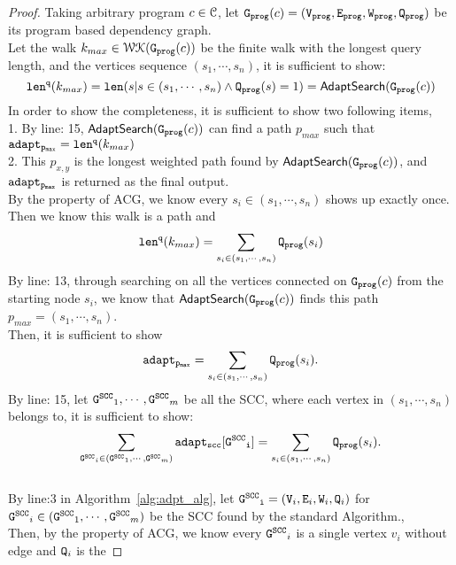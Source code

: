 \begin{proof}
  Taking arbitrary program $c \in \mathcal{C}$, let $\mathtt{{G_{prog}}}(c) = (\mathtt{{V_{prog}}}, \mathtt{{E_{prog}}}, \mathtt{{W_{prog}}}, \mathtt{{Q_{prog}}})$ be its 
  program based dependency graph.
  \\
  Let the walk $k_{max} \in \mathcal{WK}{(\mathtt{{G_{prog}}}(c))}$ be the finite walk with the longest query length, and the vertices sequence
  $(s_1, \cdots, s_n)$, 
  it is sufficient to show:
  \[
    \mathtt{len}^{\tt q}(k_{max}) = \mathtt{len}(s | s \in (s_1, \cdots, s_n) \land \mathtt{{Q_{prog}}}(s) = 1) = \mathsf{AdaptSearch}(\mathtt{{G_{prog}}}(c))
  \]
  In order to show the completeness, it is sufficient to show two following items,
  \\
  1. By line: 15, $\mathsf{AdaptSearch}(\mathtt{{G_{prog}}}(c))$ can find a path $p_{max}$ such that $\mathtt{adapt_{p_{max}}} = \mathtt{len}^{\tt q}(k_{max})$ 
  \\
  2. This $p_{x,y}$ is the longest weighted path found by $\mathsf{AdaptSearch}(\mathtt{{G_{prog}}}(c))$, and $\mathtt{adapt_{p_{max}}}$ is returned as the final output.
  \\
  By the property of ACG, we know
  every $s_i \in (s_1, \cdots, s_n)$ shows up exactly once. 
  Then we know this walk is a path and
  \[
    \mathtt{len}^{\tt q}(k_{max}) = \sum_{s_i \in (s_1, \cdots, s_n)} \mathtt{{Q_{prog}}}(s_i)
  \]
  By line: 13, through searching on all the vertices connected on $\mathtt{{G_{prog}}}(c)$ from the starting node $s_i$,
  we know that $\mathsf{AdaptSearch}(\mathtt{{G_{prog}}}(c))$ finds this path $p_{max} = (s_1, \cdots, s_n)$.
  \\
  Then, it is sufficient to show 
  $$
  \mathtt{adapt_{p_{max}}} = \sum_{s_i \in (s_1, \cdots, s_n)} \mathtt{{Q_{prog}}}(s_i).
  $$
  By line: 15, let $\mathtt{G^{SCC}}_1, \cdots, \mathtt{G^{SCC}}_m$ be all the SCC, where each vertex in 
  $(s_1, \cdots, s_n) $ belongs to, it is sufficient to show:
  \[
    \sum_{\mathtt{G^{SCC}}_i \in (\mathtt{G^{SCC}}_1, \cdots, \mathtt{G^{SCC}}_m)} \mathtt{adapt_{scc}[\mathtt{G^{SCC}}_i]} 
    = \sum_{s_i \in (s_1, \cdots, s_n)} \mathtt{{Q_{prog}}}(s_i).
    \]
  \\
  By line:3 in Algorithm~\ref{alg:adpt_alg}, 
  let $\mathtt{\mathtt{G^{SCC}}_i} = (\mathtt{V}_i, \mathtt{E}_i, \mathtt{W}_i, \mathtt{Q}_i)$ for $\mathtt{G^{SCC}}_i \in (\mathtt{G^{SCC}}_1, \cdots, \mathtt{G^{SCC}}_m)$
  be the SCC found by the standard Algorithm.,
  \\
  Then, by the property of ACG, we know every $\mathtt{G^{SCC}}_i$ is a single vertex $v_i$ without edge and $\mathtt{Q}_i$ is the 

\end{proof}
